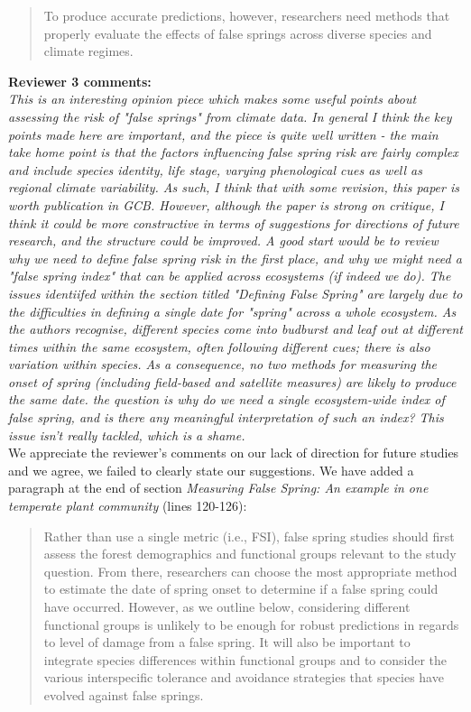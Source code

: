 \documentclass[11pt,a4paper]{article}
\begin{document}
\begin{quotation}
To produce accurate predictions, however, researchers need methods that properly evaluate the effects of false springs across diverse species and climate regimes. 
\end{quotation} 

\textbf{ Reviewer 3 comments:} \\

\textit{This is an interesting opinion piece which makes some useful points about assessing the risk of "false springs" from climate data.  In general I think the key points made here are important, and the piece is quite well written - the main take home point is that the factors influencing false spring risk are fairly complex and include species identity, life stage, varying phenological cues as well as regional climate variability.  As such, I think that with some revision, this paper is worth publication in GCB. However, although the paper is strong on critique, I think it could be more constructive in terms of suggestions for directions of future research, and the structure could be improved.  A good start would be to review why we need to define false spring risk in the first place, and why we might need a "false spring index" that can be applied across ecosystems (if indeed we do).  The issues identiifed within the section titled "Defining False Spring" are largely due to the difficulties in defining a single date for "spring" across a whole ecosystem.  As the authors recognise, different species come into budburst and leaf out at different times within the same ecosystem, often following different cues; there is also variation within species.  As a consequence, no two methods for measuring the onset of spring (including field-based and satellite measures) are likely to produce the same date.  the question is why do we need a single ecosystem-wide index of false spring, and is there any meaningful interpretation of such an index?  This issue isn't really tackled, which is a shame. } \\

We appreciate the reviewer's comments on our lack of direction for future studies and we agree, we failed to clearly state our suggestions. We have added a paragraph at the end of section \textit{Measuring False Spring: An example in one temperate plant community} (lines 120-126): \\

\begin{quotation}
Rather than use a single metric (i.e., FSI), false spring studies should first assess the forest demographics and functional groups relevant to the study question. From there, researchers can choose the most appropriate method to estimate the date of spring onset to determine if a false spring could have occurred. However, as we outline below, considering different functional groups is unlikely to be enough for robust predictions in regards to level of damage from a false spring. It will also be important to integrate species differences within functional groups and to consider the various interspecific tolerance and avoidance strategies that species have evolved against false springs.
\end{quotation} 
\end{document}
